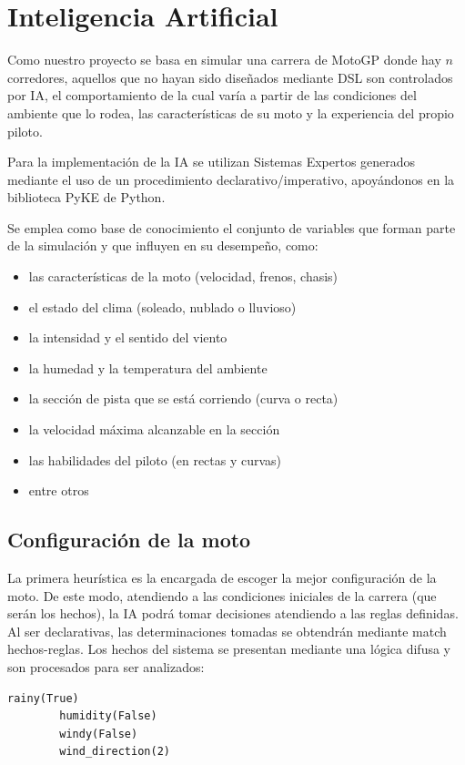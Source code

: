 \documentclass[12pt, letterpaper,spanish]{article}
\theoremstyle{definition}
\theoremstyle{remark}
\begin{document}
\newpage

\section{Inteligencia Artificial  {\footnotesize \cite{conferenciasIA}\cite{russell}}}
	Como nuestro proyecto se basa en simular una carrera de MotoGP donde hay $n$ corredores, aquellos que no hayan sido diseñados mediante DSL son controlados por IA, el comportamiento de la cual varía a partir de las condiciones del ambiente que lo rodea, las características de su moto y la experiencia del propio piloto.
	
	Para la implementación de la IA se utilizan Sistemas Expertos generados mediante el uso de un procedimiento declarativo/imperativo, apoyándonos en la biblioteca PyKE\cite{pyke} de Python.
	
	Se emplea como base de conocimiento el conjunto de variables que forman parte de la simulación y que influyen en su desempeño, como:
	\begin{itemize}
		\item las características de la moto (velocidad, frenos, chasis)
		\item el estado del clima (soleado, nublado o lluvioso)
		\item la intensidad y el sentido del viento
		\item la humedad y la temperatura del ambiente
		\item la sección de pista que se está corriendo (curva o recta)
		\item la velocidad máxima alcanzable en la sección
		\item las habilidades del piloto (en rectas y curvas)
		\item entre otros
	\end{itemize}
	
	\subsection{Configuración de la moto}
	La primera heurística es la encargada de escoger la mejor configuración de la moto. De este modo, atendiendo a las condiciones iniciales de la carrera (que serán los hechos), la IA podrá tomar decisiones atendiendo a las reglas definidas. Al ser declarativas, las determinaciones tomadas se obtendrán mediante match hechos-reglas.
	Los hechos del sistema se presentan mediante una lógica difusa y son procesados para ser analizados:
	\begin{lstlisting}[language={PySharp}, label={Script}]
		rainy(True)
		humidity(False)
		windy(False)
		wind_direction(2)
	\end{lstlisting}
	
\end{document}
